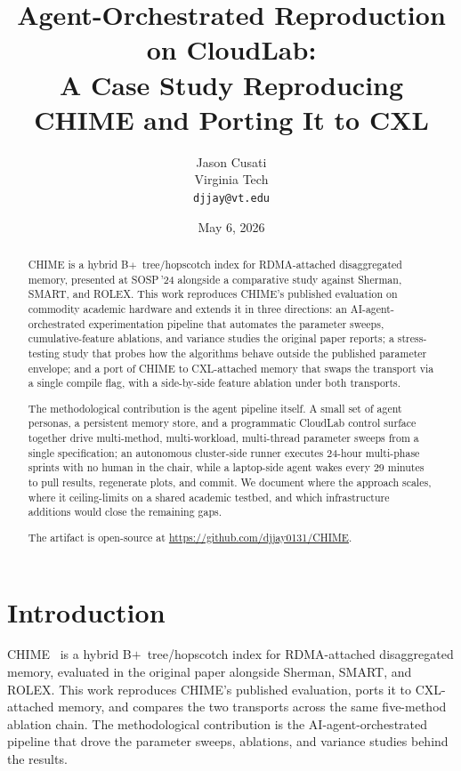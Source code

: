 \documentclass[11pt,a4paper]{article}
\title{Agent-Orchestrated Reproduction on CloudLab:\\
A Case Study Reproducing CHIME and Porting It to CXL}
\author{Jason Cusati\\
Virginia Tech\\
\texttt{djjay@vt.edu}}
\date{May 6, 2026}
\begin{document}
\sloppy  %

\maketitle

\begin{abstract}
CHIME is a hybrid B$+$~tree/hopscotch index for RDMA-attached disaggregated memory, presented at SOSP\,'24 alongside a comparative study against Sherman, SMART, and ROLEX. This work reproduces CHIME's published evaluation on commodity academic hardware and extends it in three directions: an AI-agent-orchestrated experimentation pipeline that automates the parameter sweeps, cumulative-feature ablations, and variance studies the original paper reports; a stress-testing study that probes how the algorithms behave outside the published parameter envelope; and a port of CHIME to CXL-attached memory that swaps the transport via a single compile flag, with a side-by-side feature ablation under both transports.

The methodological contribution is the agent pipeline itself. A small set of agent personas, a persistent memory store, and a programmatic CloudLab control surface together drive multi-method, multi-workload, multi-thread parameter sweeps from a single specification; an autonomous cluster-side runner executes 24-hour multi-phase sprints with no human in the chair, while a laptop-side agent wakes every 29 minutes to pull results, regenerate plots, and commit. We document where the approach scales, where it ceiling-limits on a shared academic testbed, and which infrastructure additions would close the remaining gaps.

The artifact is open-source at \url{https://github.com/djjay0131/CHIME}.
\end{abstract}

\newpage
\tableofcontents
\newpage

\section{Introduction}
\label{sec:intro}

CHIME~\cite{chime2024} is a hybrid B$+$~tree/hopscotch index for RDMA-attached disaggregated memory, evaluated in the original paper alongside Sherman, SMART, and ROLEX. This work reproduces CHIME's published evaluation, ports it to CXL-attached memory, and compares the two transports across the same five-method ablation chain. The methodological contribution is the AI-agent-orchestrated pipeline that drove the parameter sweeps, ablations, and variance studies behind the results.
\end{document}
